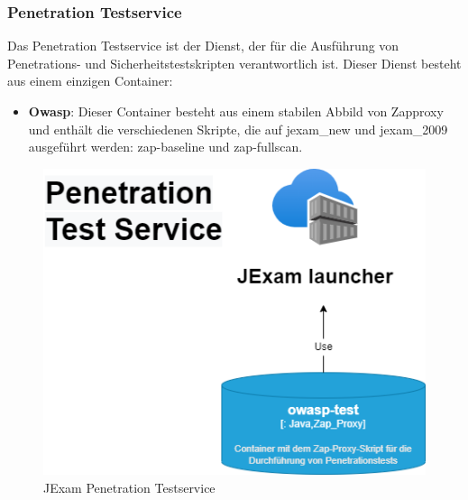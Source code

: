 \subsubsection{Penetration Testservice}

Das Penetration Testservice ist der Dienst, der für die Ausführung
von Penetrations- und Sicherheitstestskripten verantwortlich ist.
Dieser Dienst besteht aus einem einzigen Container:

\begin{itemize}
    \setlength\itemsep{1em}

    \item[] \textbf{Owasp}: Dieser Container besteht aus einem
    stabilen Abbild von Zapproxy und enthält die verschiedenen
    Skripte, die auf \Gls{jexam_new} und \Gls{jexam_2009}
    ausgeführt werden: zap-baseline und zap-fullscan.

\end{itemize}

\begin{figure}[H]
    \centering
    \includegraphics[scale=0.6]{images/penetration.drawio}
    \caption{JExam Penetration Testservice} \label{fig:pen}
\end{figure}